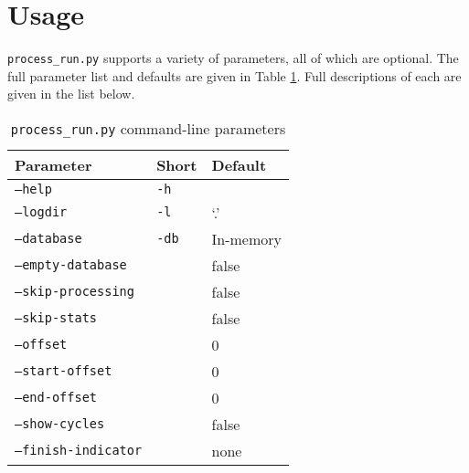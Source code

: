 \section{Usage}
\label{sec:proc_usage}
\par \texttt{process\_run.py} supports a variety of parameters, all of which are optional. The full parameter list and defaults are given in Table \ref{tbl:process_run_param}. Full descriptions of each are given in the list below.

\begin{table}
\caption{\texttt{process\_run.py} command-line parameters}
\label{tbl:process_run_param}
\centering
\begin{tabular}{l|l|l}
Parameter & Short & Default\\
\hline
\texttt{--help} & \texttt{-h} & \\
\texttt{--logdir} & \texttt{-l} & `.' \\
\texttt{--database} & \texttt{-db} & In-memory\\
\texttt{--empty-database} & & false\\
\texttt{--skip-processing} & & false\\
\texttt{--skip-stats} & & false\\
\texttt{--offset} & & 0\\
\texttt{--start-offset} & & 0\\
\texttt{--end-offset} & & 0\\
\texttt{--show-cycles} & & false\\
\texttt{--finish-indicator} & & none
\end{tabular}
\end{table}

